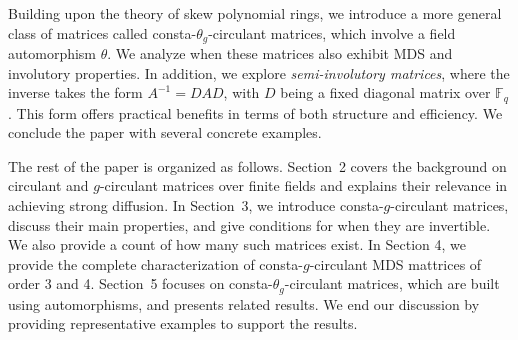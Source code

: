 \documentclass[12pt]{article}
\begin{document}
Building upon the theory of skew polynomial rings, we introduce a more general class of matrices called consta-$\theta_g$-circulant matrices, which involve a field automorphism $\theta$. We analyze when these matrices also exhibit MDS and involutory properties. In addition, we explore \emph{semi-involutory matrices}, where the inverse takes the form $A^{-1} = DAD$, with $D$ being a fixed diagonal matrix over $\mathbb{F}_q$. This form offers practical benefits in terms of both structure and efficiency. We conclude the paper with several concrete examples.

The rest of the paper is organized as follows. Section~2 covers the background on circulant and \(g\)-circulant matrices over finite fields and explains their relevance in achieving strong diffusion. In Section~3, we introduce consta-\(g\)-circulant matrices, discuss their main properties, and give conditions for when they are invertible. We also provide a count of how many such matrices exist. In Section 4, we provide the complete characterization of consta-$g$-circulant MDS mattrices of order 3 and 4. Section~5 focuses on consta-\(\theta_g\)-circulant matrices, which are built using automorphisms, and presents related results. We end our discussion by providing representative examples to support the results.
\end{document}
